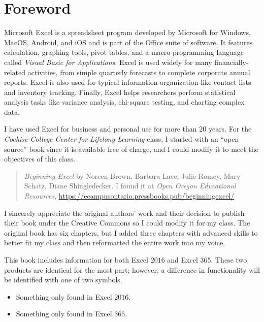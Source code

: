 \chapter*{Foreword}\label{ch:foreword}

Microsoft Excel is a spreadsheet program developed by Microsoft for Windows, MacOS, Android, and iOS and is part of the Office suite of software. It features calculation, graphing tools, pivot tables, and a macro programming language called \textit{Visual Basic for Applications}. Excel is used widely for many financially-related activities, from simple quarterly forecasts to complete corporate annual reports. Excel is also used for typical information organization like contact lists and inventory tracking. Finally, Excel helps researchers perform statistical analysis tasks like variance analysis, chi-square testing, and charting complex data.

I have used Excel for business and personal use for more than $ 20 $ years. For the \textit{Cochise College Center for Lifelong Learning} class, I started with an ``open source'' book since it is available free of charge, and I could modify it to meet the objectives of this class.

\begin{quote}
	\textit{Beginning Excel} by Noreen Brown, Barbara Lave, Julie Romey, Mary Schatz, Diane Shingledecker. I found it at \textit{Open Oregon Educational Resources}, \url{https://ecampusontario.pressbooks.pub/beginningexcel/}
\end{quote}

I sincerely appreciate the original authors' work and their decision to publish their book under the Creative Commons so I could modify it for my class. The original book has six chapters, but I added three chapters with advanced skills to better fit my class and then reformatted the entire work into my voice.

This book includes information for both Excel $ 2016 $ and Excel $ 365 $. These two products are identical for the most part; however, a difference in functionality will be identified with one of two symbols. 

\begin{itemize}
	\item {} Something only found in Excel $ 2016 $. 
	\item {} Something only found in Excel $ 365 $.
\end{itemize}

